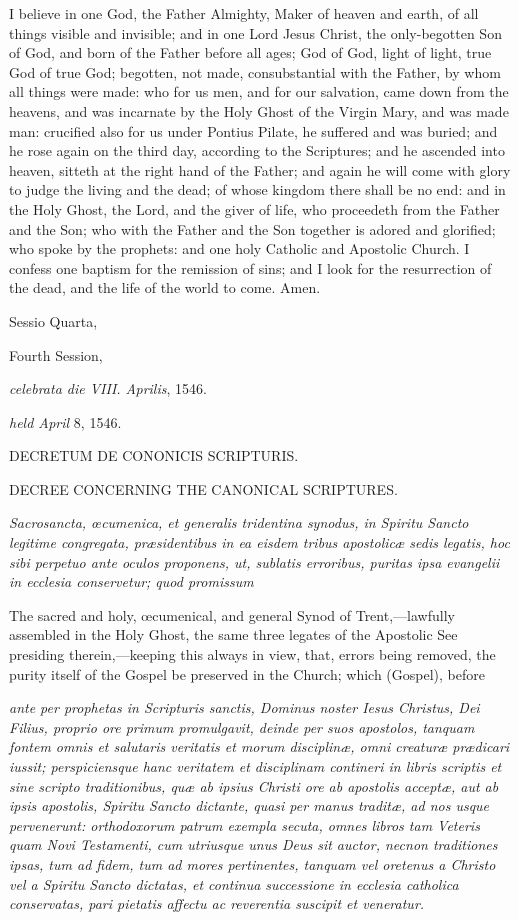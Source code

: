 I believe in one God, the Father Almighty, Maker of heaven and earth, of all things visible and invisible; and in one Lord Jesus Christ, the only-begotten Son of God, and born of the Father before all ages; God of God, light of light, true God of true God; begotten, not made, consubstantial with the Father, by whom all things were made: who for us men, and for our salvation, came down from the heavens, and was incarnate by the Holy Ghost of the Virgin Mary, and was made man: crucified also for us under Pontius Pilate, he suffered and was buried; and he rose again on the third day, according to the Scriptures; and he ascended into heaven, sitteth at the right hand of the Father; and again he will come with glory to judge the living and the dead; of whose kingdom there shall be no end: and in the Holy Ghost, the Lord, and the giver of life, who proceedeth from the Father and the Son; who with the Father and the Son together is adored and glorified; who spoke by the prophets: and one holy Catholic and Apostolic Church. I confess one baptism for the remission of sins; and I look for the resurrection of the dead, and the life of the world to come. Amen.


Sessio Quarta,

Fourth Session,

\emph{celebrata die VIII. Aprilis}, 1546.

\emph{held April} 8, 1546.

DECRETUM DE CONONICIS SCRIPTURIS.

DECREE CONCERNING THE CANONICAL SCRIPTURES.

\emph{Sacrosancta, œcumenica, et generalis tridentina synodus, in Spiritu Sancto legitime congregata, præsidentibus in ea eisdem tribus apostolicæ sedis legatis, hoc sibi perpetuo ante oculos proponens, ut, sublatis erroribus, puritas ipsa evangelii in ecclesia conservetur; quod promissum }

The sacred and holy, œcumenical, and general Synod of Trent,—lawfully assembled in the Holy Ghost, the same three legates of the Apostolic See presiding therein,—keeping this always in view, that, errors being removed, the purity itself of the Gospel be preserved in the Church; which (Gospel), before

\emph{ante per prophetas in Scripturis sanctis, Dominus noster Iesus Christus, Dei Filius, proprio ore primum promulgavit, deinde per suos apostolos, tanquam fontem omnis et salutaris veritatis et morum disciplinæ, omni creaturæ prædicari iussit; perspiciensque hanc veritatem et disciplinam contineri in libris scriptis et sine scripto traditionibus, quæ ab ipsius Christi ore ab apostolis acceptæ, aut ab ipsis apostolis, Spiritu Sancto dictante, quasi per manus traditæ, ad nos usque pervenerunt: orthodoxorum patrum exempla secuta, omnes libros tam Veteris quam Novi Testamenti, cum utriusque unus Deus sit auctor, necnon traditiones ipsas, tum ad fidem, tum ad mores pertinentes, tanquam vel oretenus a Christo vel a Spiritu Sancto dictatas, et continua successione in ecclesia catholica conservatas, pari pietatis affectu ac reverentia suscipit et veneratur. }

